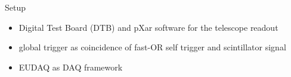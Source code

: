 \begin{frame}{Setup}
 
	\begin{figure}
		\centering
	\end{figure}\vspace*{-5pt}
 
	\begin{itemize}
		\itemfill
		\item Digital Test Board (DTB) and pXar software for the telescope readout
		\item global trigger as coincidence of fast-OR self trigger and scintillator signal
		\item EUDAQ as DAQ framework
	\end{itemize}

\end{frame}




